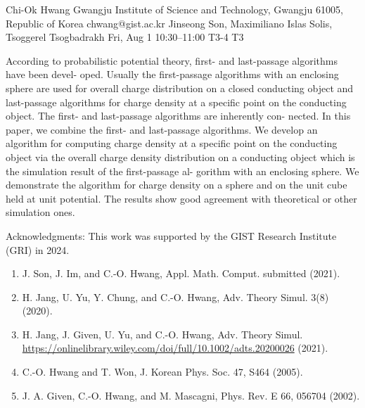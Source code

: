 \begin{talk}
  {Chi-Ok Hwang}%
  {Gwangju Institute of Science and Technology, Gwangju 61005, Republic of Korea}%
  {chwang@gist.ac.kr}%
  {Jinseong Son, Maximiliano Islas Solis, Tsoggerel Tsogbadrakh}%
  {}%
  {}%
  {Fri, Aug 1 10:30--11:00}%
  {T3-4}%
  {T3}%
  
    
   
According to probabilistic potential theory, first- and last-passage algorithms have been devel-
oped. Usually the first-passage algorithms with an enclosing sphere are used for overall charge
distribution on a closed conducting object and last-passage algorithms for charge density at a
specific point on the conducting object. The first- and last-passage algorithms are inherently con-
nected. In this paper, we combine the first- and last-passage algorithms. We develop an algorithm
for computing charge density at a specific point on the conducting object via the overall charge
density distribution on a conducting object which is the simulation result of the first-passage al-
gorithm with an enclosing sphere. We demonstrate the algorithm for charge density on a sphere
and on the unit cube held at unit potential. The results show good agreement with theoretical or
other simulation ones.


\medskip

Acknowledgments: This work was supported by the GIST Research Institute (GRI) in 2024.
\begin{enumerate}
 \item[{[1]}] J. Son, J. Im, and C.-O. Hwang, Appl. Math. Comput. submitted (2021).
 \item[{[2]}] H. Jang, U. Yu, Y. Chung, and C.-O. Hwang, Adv. Theory Simul. 3(8) (2020).
  \item[{[3]}] H. Jang, J. Given, U. Yu, and C.-O. Hwang, Adv. Theory Simul.\hfill\break
   \href{https://onlinelibrary.wiley.com/doi/full/10.1002/adts.202000268}{https://onlinelibrary.wiley.com/doi/full/10.1002/adts.20200026} (2021).
 \item[{[4]}] C.-O. Hwang and T. Won, J. Korean Phys. Soc. 47, S464 (2005).
 \item[{[5]}] J. A. Given, C.-O. Hwang, and M. Mascagni, Phys. Rev. E 66, 056704 (2002).
\end{enumerate}


\end{talk}

